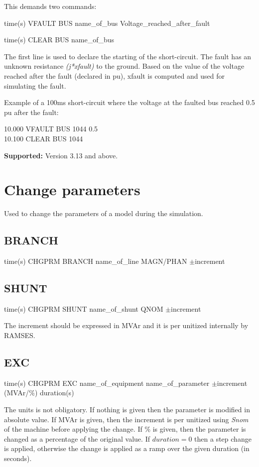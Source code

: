 This demands two commands:

time(s) VFAULT BUS name\_of\_bus Voltage\_reached\_after\_fault
	
time(s) CLEAR BUS name\_of\_bus

The first line is used to declare the starting of the short-circuit.
The fault has an unknown resistance \emph{(j{*}xfault)} to the ground.
Based on the value of the voltage reached after the fault (declared
in pu), xfault is computed and used for simulating the fault.

Example of a 100ms short-circuit where the voltage at the faulted
bus reached 0.5 pu after the fault:

10.000 VFAULT BUS 1044 0.5\\
10.100 CLEAR BUS 1044
	

\textbf{Supported:} Version 3.13 and above.


\section{Change parameters}

Used to change the parameters of a model during the simulation.


\subsection{BRANCH}

time(s) CHGPRM BRANCH name\_of\_line MAGN/PHAN
	$\pm$increment 

\subsection{SHUNT}

time(s) CHGPRM SHUNT name\_of\_shunt QNOM $\pm$increment

The increment should be expressed in MVAr and it
is per unitized internally by RAMSES.


\subsection{EXC}

time(s) CHGPRM EXC name\_of\_equipment name\_of\_parameter
	$\pm$increment (MVAr/\%) duration(s) 
	
The units is
not obligatory. If nothing is given then the parameter is modified
in absolute value. If MVAr is given, then the increment is per unitized
using \emph{Snom} of the machine before applying the change. If \%
is given, then the parameter is changed as a percentage of the original
value. If $duration=0$ then a step change is applied, otherwise the
change is applied as a ramp over the given duration (in seconds).

